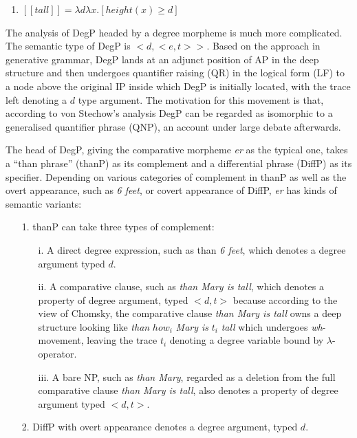 \documentclass{ctexart}
\let \cite \parencite
\begin{document}
\begin{enumerate}[resume]
    \item \label{von_stechow_LE} $[\![tall]\!] = \lambda d \lambda x. [height(x) \geq d]$
\end{enumerate}

The analysis of DegP headed by a degree morpheme is much more complicated. The semantic type of DegP is $<d,<e,t>>$. Based on the approach in generative grammar, DegP lands at an adjunct position of AP in the deep structure and then undergoes quantifier raising (QR) in the logical form (LF) to a node above the original IP inside which DegP is initially located, with the trace left denoting a $d$ type argument. The motivation for this movement is that, according to von Stechow’s analysis DegP can be regarded as isomorphic to a generalised quantifier phrase (QNP), an account under large debate afterwards.

The head of DegP, giving the comparative morpheme \textit{er} as the typical one, takes a “than phrase” (thanP) as its complement and a differential phrase (DiffP) as its specifier. Depending on various categories of complement in thanP as well as the overt appearance, such as \textit{6 feet}, or covert appearance of DiffP, \textit{er} has kinds of semantic variants:

\begin{itemize}
\item[1.]
thanP can take three types of complement:

\begin{itemize}
\item[i.]
A direct degree expression, such as than \textit{6 feet}, which denotes a degree argument typed $d$.
\item[ii.]
A comparative clause, such as \textit{than Mary is tall}, which denotes a property of degree argument, typed $<d,t>$ because according to the view of Chomsky, the comparative clause \textit{than Mary is tall} owns a deep structure looking like \textit{than} $how_i$ \textit{Mary is} $t_i$ \textit{tall} which undergoes \textit{wh}-movement, leaving the trace $t_i$ denoting a degree variable bound by $\lambda$-operator\cite{chomsky1977}.
\item[iii.]
A bare NP, such as \textit{than Mary}, regarded as a deletion from the full comparative clause \textit{than Mary is tall}, also denotes a property of degree argument typed $<d,t>$.
\end{itemize}

\item[2.]
DiffP with overt appearance denotes a degree argument, typed $d$.

\end{itemize}
\end{document}
